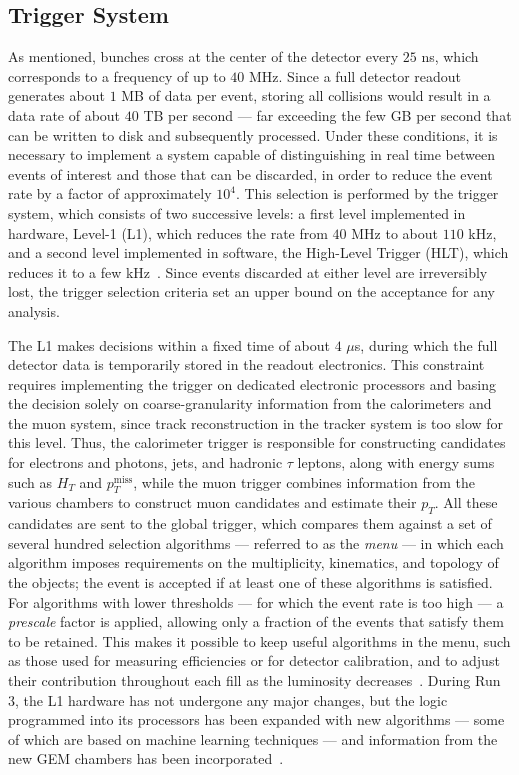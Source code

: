 \subsection{Trigger System}
\label{subsec:TRG}
%
As mentioned, bunches cross at the center of the detector every $25$ ns, which corresponds to a frequency of up to $40$ MHz. Since a full detector readout generates about $1$ MB of data per event, storing all collisions would result in a data rate of about $40$ TB per second — far exceeding the few GB per second that can be written to disk and subsequently processed. Under these conditions, it is necessary to implement a system capable of distinguishing in real time between events of interest and those that can be discarded, in order to reduce the event rate by a factor of approximately $10^4$. This selection is performed by the trigger system, which consists of two successive levels: a first level implemented in hardware, Level-1 (L1), which reduces the rate from $40$ MHz to about $110$ kHz, and a second level implemented in software, the High-Level Trigger (HLT), which reduces it to a few kHz~\cite{CMS:2016ngn,CMS:2023gfb}. Since events discarded at either level are irreversibly lost, the trigger selection criteria set an upper bound on the acceptance for any analysis.\medskip


The L1 makes decisions within a fixed time of about $4$ $\mu$s, during which the full detector data is temporarily stored in the readout electronics. This constraint requires implementing the trigger on dedicated electronic processors and basing the decision solely on coarse-granularity information from the calorimeters and the muon system, since track reconstruction in the tracker system is too slow for this level. Thus, the calorimeter trigger is responsible for constructing candidates for electrons and photons, jets, and hadronic $\tau$ leptons, along with energy sums such as $H_T$ and $p_T^\text{miss}$, while the muon trigger combines information from the various chambers to construct muon candidates and estimate their $p_T$. All these candidates are sent to the global trigger, which compares them against a set of several hundred selection algorithms — referred to as the \textit{menu} — in which each algorithm imposes requirements on the multiplicity, kinematics, and topology of the objects; the event is accepted if at least one of these algorithms is satisfied. For algorithms with lower thresholds — for which the event rate is too high — a \textit{prescale} factor is applied, allowing only a fraction of the events that satisfy them to be retained. This makes it possible to keep useful algorithms in the menu, such as those used for measuring efficiencies or for detector calibration, and to adjust their contribution throughout each fill as the luminosity decreases~\cite{CMS:2020cmk}. During Run 3, the L1 hardware has not undergone any major changes, but the logic programmed into its processors has been expanded with new algorithms — some of which are based on machine learning techniques — and information from the new GEM chambers has been incorporated~\cite{CMS:2023gfb}.\medskip

